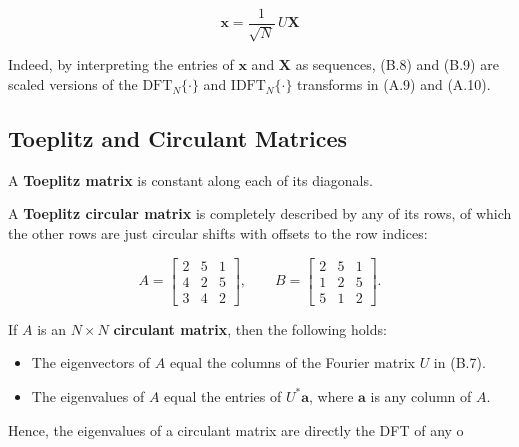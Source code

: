 \begin{equation}
\mathbf{x} = \frac{1}{\sqrt{N}} \, U \mathbf{X}
\tag{B.9}
\end{equation}

Indeed, by interpreting the entries of $\mathbf{x}$ and $\mathbf{X}$ as sequences, (B.8) and (B.9) are scaled versions of the $\text{DFT}_N\{\cdot\}$ and $\text{IDFT}_N\{\cdot\}$ transforms in (A.9) and (A.10).

\subsection*{Toeplitz and Circulant Matrices}

A \textbf{Toeplitz matrix} is constant along each of its diagonals.

A \textbf{Toeplitz circular matrix} is completely described by any of its rows,  
of which the other rows are just circular shifts with offsets to the row indices:

\begin{equation}
A =
\begin{bmatrix}
2 & 5 & 1 \\
4 & 2 & 5 \\
3 & 4 & 2
\end{bmatrix}
,\qquad
B =
\begin{bmatrix}
2 & 5 & 1 \\
1 & 2 & 5 \\
5 & 1 & 2
\end{bmatrix}.
\tag{B.10}
\end{equation}

If $A$ is an $N \times N$ \textbf{circulant matrix}, then the following holds:

\begin{itemize}
    \item The eigenvectors of $A$ equal the columns of the Fourier matrix $U$ in (B.7).
    \item The eigenvalues of $A$ equal the entries of $U^* \mathbf{a}$, where $\mathbf{a}$ is any column of $A$.
\end{itemize}

Hence, the eigenvalues of a circulant matrix are directly the DFT of any o
